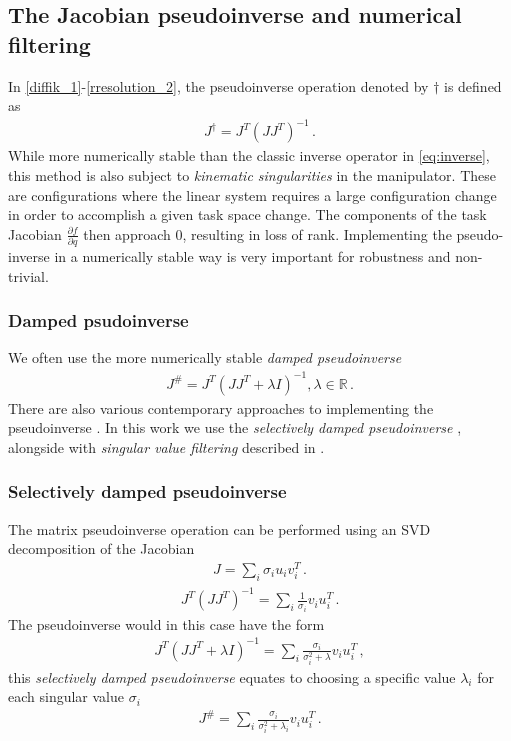 \documentclass[times, utf8, diplomski, english]{fer}
\begin{document}
\subsection{The Jacobian pseudoinverse and numerical filtering}
In \eqref{diffik_1}-\eqref{rresolution_2}, the pseudoinverse operation denoted by $\dagger$ is defined as 
\begin{align}
J^{\dagger} = J^T\left(JJ^T\right)^{-1}\, .
\end{align}
While more numerically stable than the classic inverse operator in \eqref{eq:inverse}, this method is also subject to \textit{kinematic singularities} in the manipulator.
These are configurations where the linear system requires a large configuration change in order to accomplish a given task space change.
The components of the task Jacobian $\frac{\partial f}{\partial q}$ then approach 0, resulting in loss of rank.
Implementing the pseudo-inverse in a numerically stable way is very important for robustness and non-trivial.
\subsubsection{Damped psudoinverse}
We often use the more numerically stable \textit{damped pseudoinverse} \citep{chan1988general}
\begin{align}
J^{\#} = J^T\left(JJ^T + \lambda I\right)^{-1} ,  \lambda \in \mathbb{R}\, .
\end{align}
There are also various contemporary approaches to implementing the pseudoinverse \citep{chiaverini1994review}. 
In this work we use the \textit{selectively damped pseudoinverse} \citep{buss2005selectively}, alongside with \textit{singular value filtering} described in \citep{colome2015closed}.
\subsubsection{Selectively damped pseudoinverse}
The matrix pseudoinverse operation can be performed using an SVD decomposition of the Jacobian
\begin{align}
J = \sum\limits_{i}{\sigma_{i}u_iv_i^T}\, .
\end{align}
\begin{align}
J^T\left(JJ^T\right)^{-1} = \sum\limits_{i}{\frac{1}{\sigma_{i}}v_iu_i^T}\, .
\end{align}
The pseudoinverse would in this case have the form 
\begin{align}
J^T\left(JJ^T + \lambda I\right)^{-1} = \sum\limits_{i}{\frac{\sigma_{i}}{\sigma_{i}^2 + \lambda}v_iu_i^T}\, ,
\end{align}
this \textit{selectively damped pseudoinverse} \citep{buss2005selectively} equates to choosing a specific value $\lambda_i$ for each singular value $\sigma_i$
\begin{align}\label{eq:sdp}
J^{\#} = \sum\limits_{i}{\frac{\sigma_{i}}{\sigma_{i}^2 + \lambda_i}v_iu_i^T}\, .
\end{align}
\end{document}
